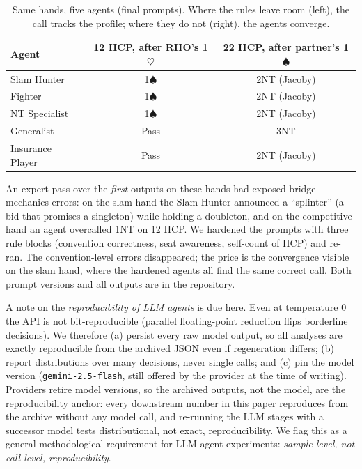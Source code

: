\documentclass[11pt,a4paper]{article}
\begin{document}
\begin{table}[h]
\centering\small
\caption{Same hands, five agents (final prompts). Where the rules
leave room (left), the call tracks the profile; where they do not
(right), the agents converge.}
\label{tab:samehand}
\begin{tabular}{lcc}
\toprule
Agent & 12 HCP, after RHO's 1$\heartsuit$ & 22 HCP, after partner's 1$\spadesuit$\\
\midrule
Slam Hunter      & 1$\spadesuit$ & 2NT (Jacoby)\\
Fighter          & 1$\spadesuit$ & 2NT (Jacoby)\\
NT Specialist    & 1$\spadesuit$ & 2NT (Jacoby)\\
Generalist       & Pass          & 3NT\\
Insurance Player & Pass          & 2NT (Jacoby)\\
\bottomrule
\end{tabular}
\end{table}

An expert pass over the \emph{first} outputs on these hands had
exposed bridge-mechanics errors: on the slam hand the Slam Hunter
announced a ``splinter'' (a bid that promises a singleton) while
holding a doubleton, and on the competitive hand an agent overcalled
1NT on 12 HCP. We hardened the prompts with three rule blocks
(convention correctness, seat awareness, self-count of HCP) and
re-ran. The convention-level errors disappeared; the price is the
convergence visible on the slam hand, where the hardened agents all
find the same correct call. Both prompt versions and all outputs are
in the repository.

A note on the \emph{reproducibility of LLM agents} is due here. Even at
temperature 0 the
API is not bit-reproducible (parallel floating-point reduction flips
borderline decisions). We therefore (a) persist every raw model output,
so all analyses are exactly reproducible from the archived JSON even if
regeneration differs; (b) report distributions over many decisions,
never single calls; and (c) pin the model version
(\texttt{gemini-2.5-flash}, still offered by the provider at the time
of writing). Providers retire model versions, so the archived outputs,
not the model, are the reproducibility anchor: every downstream number
in this paper reproduces from the archive without any model call, and
re-running the LLM stages with a successor model tests
distributional, not exact, reproducibility. We flag this as a general
methodological requirement for LLM-agent experiments:
\emph{sample-level, not call-level, reproducibility}.
\end{document}
